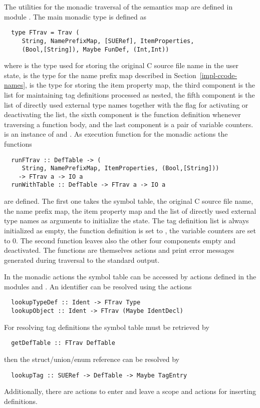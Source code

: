 The utilities for the monadic traversal of the semantics map are defined in module . 
The main monadic type is defined as
\begin{verbatim}
  type FTrav = Trav (
     String, NamePrefixMap, [SUERef], ItemProperties,
     (Bool,[String]), Maybe FunDef, (Int,Int))
\end{verbatim}
where  is the type used for storing the original C source file name in the user state,
 is the type for the name prefix map described in Section~\ref{impl-ccode-names},
 is the type for storing the item property map, the third component is the list for
maintaining tag definitions processed as nested, the fifth component is the list of directly used external type names 
together with the flag for activating or deactivating the list, the sixth component is the function definition
whenever traversing a function body, and the last component is a pair of variable counters.  is an
instance of  and . As execution function for the monadic actions the functions
\begin{verbatim}
  runFTrav :: DefTable -> (
     String, NamePrefixMap, ItemProperties, (Bool,[String]))
    -> FTrav a -> IO a
  runWithTable :: DefTable -> FTrav a -> IO a
\end{verbatim}
are defined. The first one takes the symbol table, the original C source file name, the name prefix map, 
the item property map and
the list of directly used external type names as arguments to initialize the state. The tag definition list
is always initialized as empty, the function definition is set to , the variable counters are set to 0. The second 
function leaves also the other four components empty and deactivated. The functions are themselves 
 actions and print error messages generated during traversal to the standard output.

In the monadic actions the symbol table can be accessed by actions defined in the modules 
 and . An identifier can be
resolved using the actions
\begin{verbatim}
  lookupTypeDef :: Ident -> FTrav Type
  lookupObject :: Ident -> FTrav (Maybe IdentDecl)
\end{verbatim}
For resolving tag definitions the symbol table must be retrieved by
\begin{verbatim}
  getDefTable :: FTrav DefTable
\end{verbatim}
then the struct/union/enum reference can be resolved by
\begin{verbatim}
  lookupTag :: SUERef -> DefTable -> Maybe TagEntry
\end{verbatim}
Additionally, there are actions to enter and leave a scope and actions for inserting definitions.

